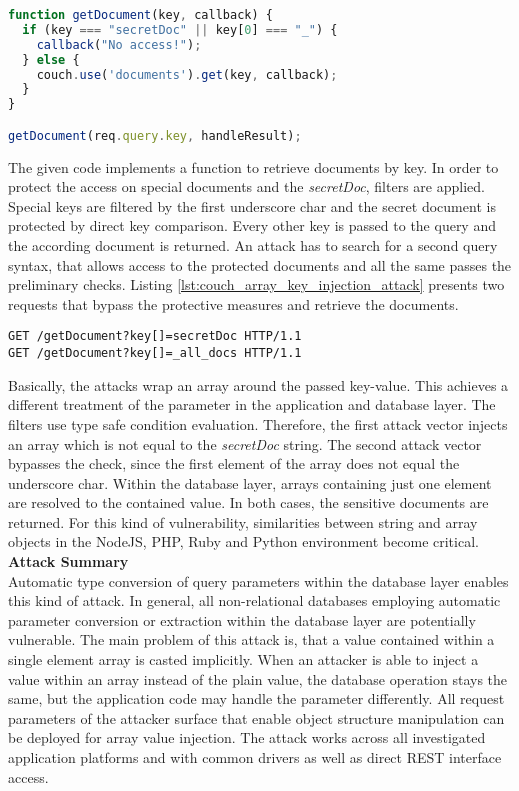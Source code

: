 \begin{lstlisting}[caption={Vulnerable NodeJS example for array key injection against CouchDB}, label={lst:couch_array_key_injection}, language=JavaScript]
function getDocument(key, callback) {
  if (key === "secretDoc" || key[0] === "_") {
    callback("No access!");
  } else {
    couch.use('documents').get(key, callback);
  }
}

getDocument(req.query.key, handleResult);
\end{lstlisting}

The given code implements a function to retrieve documents by key. In order to protect the access on special documents and the \emph{secretDoc}, filters are applied. Special keys are filtered by the first underscore char and the secret document is protected by direct key comparison. Every other key is passed to the query and the according document is returned. An attack has to search for a second query syntax, that allows access to the protected documents and all the same passes the preliminary checks. Listing \ref{lst:couch_array_key_injection_attack} presents two requests that bypass the protective measures and retrieve the documents. \\

\begin{lstlisting}[caption={Attack vectors against CouchDB for array key injection via the query-string parameter}, label={lst:couch_array_key_injection_attack}]
GET /getDocument?key[]=secretDoc HTTP/1.1
GET /getDocument?key[]=_all_docs HTTP/1.1
\end{lstlisting}

Basically, the attacks wrap an array around the passed key-value. This achieves a different treatment of the parameter in the application and database layer. The filters use type safe condition evaluation. Therefore, the first attack vector injects an array which is not equal to the \emph{secretDoc} string. The second attack vector bypasses the check, since the first element of the array does not equal the underscore char. Within the database layer, arrays containing just one element are resolved to the contained value. In both cases, the sensitive documents are returned. For this kind of vulnerability, similarities between string and array objects in the NodeJS, PHP, Ruby and Python environment become critical. \\

\textbf{Attack Summary} \\
Automatic type conversion of query parameters within the database layer enables this kind of attack. In general, all non-relational databases employing automatic parameter conversion or extraction within the database layer are potentially vulnerable. The main problem of this attack is, that a value contained within a single element array is casted implicitly. When an attacker is able to inject a value within an array instead of the plain value, the database operation stays the same, but the application code may handle the parameter differently. All request parameters of the attacker surface that enable object structure manipulation can be deployed for array value injection. The attack works across all investigated application platforms and with common drivers as well as direct REST interface access. 

